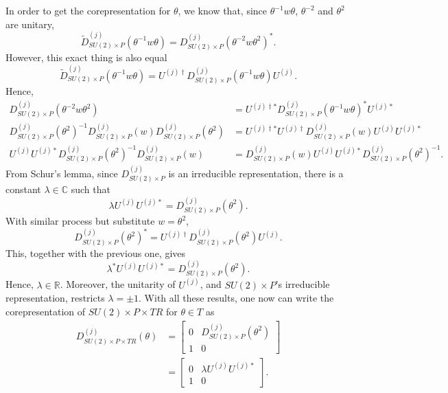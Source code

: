 \documentclass[preprint, 12pt]{revtex4-2}
\numberwithin{equation}{section}
\begin{document}
In order to get the corepresentation for $\theta$, we know that, since $\theta^{-1}w\theta$, $\theta^{-2}$ and $\theta^{2}$ are unitary,
\begin{equation}
    \tilde{D}^{(j)}_{SU(2)\times P}(\theta^{-1}w\theta) = D^{(j)}_{SU(2)\times P}(\theta^{-2}w\theta^2)^\ast.
\end{equation}
However, this exact thing is also equal
\begin{equation}
    \tilde{D}^{(j)}_{SU(2)\times P}(\theta^{-1}w\theta) = U^{(j)\dagger}D^{(j)}_{SU(2)\times P}(\theta^{-1}w\theta)U^{(j)}.
\end{equation}
Hence,
\begin{equation}
    \begin{aligned}
        D^{(j)}_{SU(2)\times P}(\theta^{-2}w\theta^2) &= U^{(j)\dagger\ast}D^{(j)}_{SU(2)\times P}(\theta^{-1}w\theta)^\ast U^{(j)\ast} \\
        D^{(j)}_{SU(2)\times P}(\theta^{2})^{-1}D^{(j)}_{SU(2)\times P}(w)D^{(j)}_{SU(2)\times P}(\theta^2)&= U^{(j)\dagger\ast}U^{(j)\dagger}D^{(j)}_{SU(2)\times P}(w)U^{(j)}U^{(j)\ast} \\
        U^{(j)}U^{(j)\ast}D^{(j)}_{SU(2)\times P}(\theta^{2})^{-1}D^{(j)}_{SU(2)\times P}(w) &= D^{(j)}_{SU(2)\times P}(w)U^{(j)}U^{(j)\ast}D^{(j)}_{SU(2)\times P}(\theta^2)^{-1}.
    \end{aligned}
\end{equation}
From Schur's lemma, since $D^{(j)}_{SU(2)\times P}$ is an irreducible representation, there is a constant $\lambda\in\mathbb{C}$ such that
\begin{equation}
    \lambda U^{(j)}U^{(j)\ast} = D^{(j)}_{SU(2)\times P}(\theta^{2}).
\end{equation}
With similar process but substitute $w=\theta^2$,
\begin{equation}
    D^{(j)}_{SU(2)\times P}(\theta^{2})^\ast = U^{(j)\dagger}D^{(j)}_{SU(2)\times P}(\theta^{2})U^{(j)}.
\end{equation}
This, together with the previous one, gives
\begin{equation}
    \lambda^\ast U^{(j)}U^{(j)\ast} = D^{(j)}_{SU(2)\times P}(\theta^{2}).
\end{equation}
Hence, $\lambda\in\mathbb{R}$. Moreover, the unitarity of $U^{(j)}$, and $SU(2)\times P$'s irreducible representation, restricts $\lambda = \pm 1$. With all these results, one now can write the corepresentation of $SU(2)\times P\times TR$ for $\theta\in T$ as
\begin{equation}
    \begin{aligned}
        D_{SU(2)\times P\times TR}^{(j)}(\theta) &= 
        \begin{bmatrix}
            0 & D^{(j)}_{SU(2)\times P}(\theta^2) \\
            1 & 0
        \end{bmatrix} \\
        &= \begin{bmatrix}
            0 & \lambda U^{(j)}U^{(j)\ast} \\
            1 & 0
        \end{bmatrix}.
    \end{aligned}
\end{equation}
\end{document}
